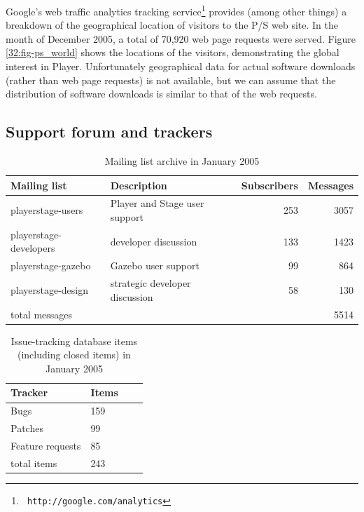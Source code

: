 Google's web traffic analytics tracking service\footnote{\tt
http://google.com/analytics} provides (among other things) a
breakdown of the geographical location of visitors to the P/S web site. In
the month of December 2005, a total of 70,920 web page requests were
served. Figure
\ref{32:fig-ps_world} shows the locations of the visitors, 
demonstrating the global interest in Player. Unfortunately
geographical data for actual software downloads (rather than web page
requests) is not available, but we can assume that the distribution of
software downloads is similar to that of the web requests.

\subsection{Support forum and trackers} 

\begin{table}[top]
\begin{center}
\begin{tabular}{|l|l|r|r|}
\hline
{\bf Mailing list} & {\bf Description} & {\bf Subscribers} & {\bf Messages} \\ \hline
playerstage-users & Player and Stage user support & 253 & 3057 \\
playerstage-developers & developer discussion & 133 & 1423 \\
playerstage-gazebo & Gazebo user support & 99 & 864 \\
playerstage-design & strategic developer discussion & 58 & 130 \\ \hline
total messages & & & 5514 \\ \hline
\end{tabular}
\caption{\label{32:table-lists}Mailing list archive in January 2005}
\end{center}
\end{table}

\begin{table}[top]
\begin{center}
\begin{tabular}{|l|l|r|r|}
\hline
{\bf Tracker} & {\bf Items} \\ \hline
Bugs & 159 \\
Patches & 99 \\
Feature requests & 85 \\ \hline
total items & 243 \\ \hline
\end{tabular}
\caption{\label{32:table-trackers}Issue-tracking database items (including closed items) in January 2005}
\end{center}
\end{table}


